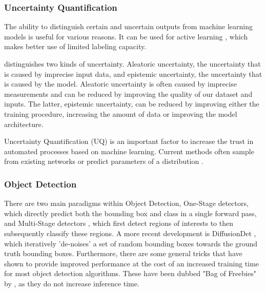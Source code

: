 \subsubsection{Uncertainty Quantification}\label{sec:broadliterature:uncertainty}
The ability to distinguish certain and uncertain outputs from machine learning models is useful for various reasons. It can be used for active learning \cite{yang2009effective,settles2009active,houlsby2011bayesian,Bernhardt_2022}, which makes better use of limited labeling capacity.

\citep{gal2016uncertainty} distinguishes two kinds of uncertainty. Aleatoric uncertainty, the uncertainty that is caused by imprecise input data, and epistemic uncertainty, the uncertainty that is caused by the model. Aleatoric uncertainty is often caused by imprecise measurements and can be reduced by improving the quality of our dataset and inputs. The latter, epistemic uncertainty, can be reduced by improving either the training procedure, increasing the amount of data or improving the model architecture.

Uncertainty Quantification (UQ) is an important factor to increase the trust in automated processes based on machine learning. Current methods often sample from existing networks \cite{gal2016dropout,NEURIPS2019_118921ef,miller2019evaluating} or predict parameters of a distribution \cite{choi2019gaussian,swiatkowski2020ktied}.


\subsubsection{Object Detection}\label{sec:broadliterature:object_detection}

There are two main paradigms within Object Detection, One-Stage detectors\cite{zhou2019objects, bochkovskiy2020yolov4, wang2022yolov7, liu2016ssd, duan2019centernet}, which directly predict both the bounding box and class in a single forward pass, and Multi-Stage detectors \cite{girshick2014rich, girshick2015fast}, which first detect regions of interests to then subsequently classify these regions. A more recent development is DiffusionDet \cite{chen2023diffusiondet}, which iteratively 'de-noises' a set of random bounding boxes towards the ground truth bounding boxes. Furthermore, there are some general tricks that have shown to provide improved performance at the cost of an increased training time for most object detection algorithms. These have been dubbed "Bag of Freebies" by \citep*{zhang2019bag}, as they do not increase inference time.


